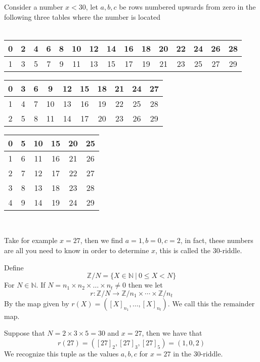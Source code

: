 \begin{exmp}
 Consider a number $x<30$, let $a,b,c$ be rows numbered upwards from zero in the following three tables where the number is located
\\\\\begin{centering}\begin{tabular}{|ccccccccccccccc|}
    \hline
    0 & 2 & 4 & 6 & 8 & 10 & 12 & 14 & 16 & 18 & 20 & 22 & 24 & 26 & 28 \\
    \hline
    1 & 3 & 5 & 7 & 9 & 11 & 13 & 15 & 17 & 19 & 21 & 23 & 25 & 27 & 29 \\
    \hline
\end{tabular}

\begin{tabular}{|cccccccccc|}
    \hline
    0 & 3 & 6 & 9 & 12 & 15 & 18 & 21 & 24 & 27 \\
    \hline
    1 & 4 & 7 & 10 & 13 & 16 & 19 & 22 & 25 & 28 \\
    \hline
    2 & 5 & 8 & 11 & 14 & 17 & 20 & 23 & 26 & 29 \\
    \hline
\end{tabular}

\begin{tabular}{|cccccc|}
    \hline
    0 & 5 & 10 & 15 & 20 & 25 \\ 
    \hline
    1 & 6 & 11 & 16 & 21 & 26 \\
    \hline
    2 & 7 & 12 & 17 & 22 & 27 \\
    \hline
    3 & 8 & 13 & 18 & 23 & 28 \\
    \hline
    4 & 9 & 14 & 19 & 24 & 29 \\
    \hline
\end{tabular}\\\end{centering}\vskip 10pt
Take for example $x=27$, then we find $a=1,b=0,c=2$, in fact, these numbers are all you need to know in order to determine $x$, this is called the 30-riddle.
\end{exmp}
\begin{defi}
    Define
    \[
        \mathbb{Z}/N=\{X\in\mathbb{N}~|~0\leq X<N\}
    \]
    For $N\in\mathbb{N}$. If $N=n_{1}\times n_{2}\times\ldots\times n_{t}\neq 0$ then we let
    \[
        r:\mathbb{Z}/N\rightarrow\mathbb{Z}/n_{1}\times\cdots\times\mathbb{Z}/n_{t}
    \]
    By the map given by $r(X)=([X]_{n_{1}},\ldots,[X]_{n_{t}})$. We call this the remainder map.
\end{defi}
\begin{exmp}
  Suppose that $N=2\times 3\times 5=30$ and $x=27$, then we have that
  \[
      r(27)=\left([27]_{2},[27]_{3},[27]_{5}\right)=(1,0,2)
  \]
  We recognize this tuple as the values $a,b,c$ for $x=27$ in the 30-riddle.
\end{exmp}
